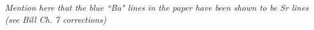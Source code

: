 \emph{\color{gray}Mention here that the blue ``Ba" lines in the paper have been shown to be Sr lines (see Bill Ch. 7 corrections)}


